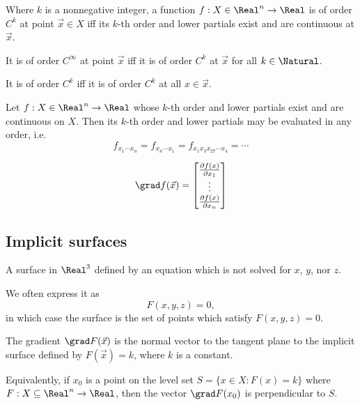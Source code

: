 \begin{definition}[$C^k$ function]
  Where $k$ is a nonnegative integer, a function $f : X \in \Real^n \to \Real$ is of order $C^k$ at point $\vec{x} \in X$ iff its $k$-th order and lower partials exist and are continuous at $\vec{x}$. 

  It is of order $C^\infty$ at point $\vec{x}$ iff it is of order $C^k$ at $\vec{x}$ for all $k \in \Natural$.
  
  It is of order $C^k$ iff it is of order $C^k$ at all $x \in \vec{x}$.
\end{definition}

\begin{theorem}
  Let $f : X \in \Real^n \to \Real$ whose $k$-th order and lower partials exist and are continuous on $X$. Then its $k$-th order and lower partials may be evaluated in any order, i.e.
  \[
    f_{x_1 \cdots x_n} = f_{x_n \cdots x_1} = f_{x_1 x_3 x_{27} \cdots x_4} = \cdots
  \]
\end{theorem}

\begin{definition}[Gradient]
  \[
    \grad f(\vec{x}) = \begin{bmatrix}
      \frac{\partial f(x)}{\partial x_1} \\
      \vdots \\
      \frac{\partial f(x)}{\partial x_n}
    \end{bmatrix}
  \]
\end{definition}

\subsection{Implicit surfaces}


\begin{definition}
  A surface in $\Real^3$ defined by an equation which is not solved for $x$, $y$, nor $z$.

  We often express it as
  \[
    F(x, y, z) = 0,
  \]
  in which case the surface is the set of points which satisfy $F(x, y, z) = 0$.
\end{definition}

\begin{theorem}
  The gradient $\grad F(\vec{x})$ is the normal vector to the tangent plane to the implicit surface defined by $F(\vec{x}) = k$, where $k$ is a constant.

  Equivalently, if $x_0$ is a point on the level set $S = \{ x \in X : F(x) = k \}$ where $F : X \subseteq \Real^n \to \Real$, then the vector $\grad F(x_0)$ is perpendicular to $S$.
\end{theorem}


